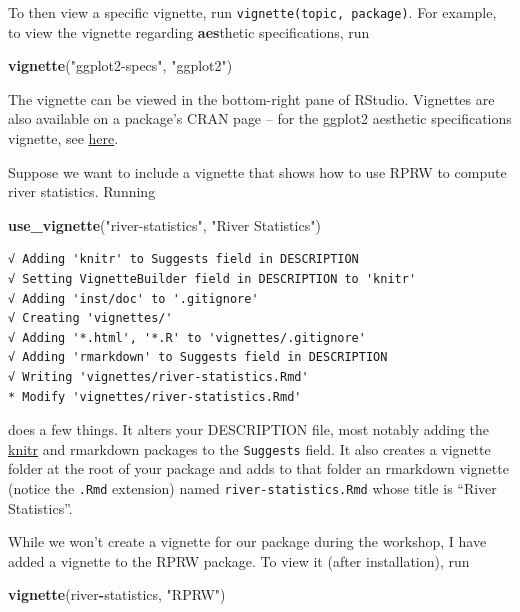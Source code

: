 \documentclass[
]{book}
\newenvironment{Shaded}{\begin{snugshade}}{\end{snugshade}}
\newcommand{\KeywordTok}[1]{\textcolor[rgb]{0.13,0.29,0.53}{\textbf{#1}}}
\newcommand{\NormalTok}[1]{#1}
\newcommand{\OperatorTok}[1]{\textcolor[rgb]{0.81,0.36,0.00}{\textbf{#1}}}
\newcommand{\StringTok}[1]{\textcolor[rgb]{0.31,0.60,0.02}{#1}}
\begin{document}
To then view a specific vignette, run \texttt{vignette(topic,\ package)}. For example, to view the vignette regarding \textbf{aes}thetic specifications, run

\begin{Shaded}
\begin{Highlighting}[]
\KeywordTok{vignette}\NormalTok{(}\StringTok{"ggplot2-specs"}\NormalTok{, }\StringTok{"ggplot2"}\NormalTok{)}
\end{Highlighting}
\end{Shaded}

The vignette can be viewed in the bottom-right pane of RStudio. Vignettes are also available on a package's CRAN page -- for the ggplot2 aesthetic specifications vignette, see \href{https://cran.r-project.org/web/packages/ggplot2/vignettes/ggplot2-specs.html}{here}.

Suppose we want to include a vignette that shows how to use RPRW to compute river statistics. Running

\begin{Shaded}
\begin{Highlighting}[]
\KeywordTok{use_vignette}\NormalTok{(}\StringTok{"river-statistics"}\NormalTok{, }\StringTok{"River Statistics"}\NormalTok{)}
\end{Highlighting}
\end{Shaded}

\begin{verbatim}
√ Adding 'knitr' to Suggests field in DESCRIPTION
√ Setting VignetteBuilder field in DESCRIPTION to 'knitr'
√ Adding 'inst/doc' to '.gitignore'
√ Creating 'vignettes/'
√ Adding '*.html', '*.R' to 'vignettes/.gitignore'
√ Adding 'rmarkdown' to Suggests field in DESCRIPTION
√ Writing 'vignettes/river-statistics.Rmd'
* Modify 'vignettes/river-statistics.Rmd'
\end{verbatim}

does a few things. It alters your DESCRIPTION file, most notably adding the \href{https://yihui.org/knitr/}{knitr} and rmarkdown packages to the \texttt{Suggests} field. It also creates a vignette folder at the root of your package and adds to that folder an rmarkdown vignette (notice the \texttt{.Rmd} extension) named \texttt{river-statistics.Rmd} whose title is ``River Statistics''.

While we won't create a vignette for our package during the workshop, I have added a vignette to the RPRW package. To view it (after installation), run

\begin{Shaded}
\begin{Highlighting}[]
\KeywordTok{vignette}\NormalTok{(river}\OperatorTok{-}\NormalTok{statistics, }\StringTok{"RPRW"}\NormalTok{)}
\end{Highlighting}
\end{Shaded}
\end{document}
